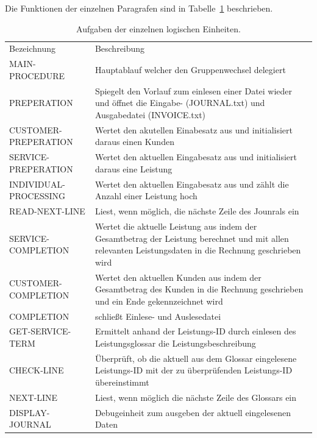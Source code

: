 Die Funktionen der einzelnen Paragrafen sind in Tabelle~\ref{tab:prog-strukt} beschrieben.


\begin{table}[!htb]
    \centering
    \begin{tabularx}{\textwidth}{X | X }
       \rowcolor{fhfarbe!25}
       Bezeichnung                             & Beschreibung             \\
       \rowcolor{fhfarbe!10}
       MAIN-PROCEDURE & Hauptablauf welcher den Gruppenwechsel delegiert \\
       PREPERATION & Spiegelt den Vorlauf zum einlesen einer Datei wieder und öffnet die Eingabe- (JOURNAL.txt) und Ausgabedatei (INVOICE.txt) \\
       CUSTOMER-PREPERATION & Wertet den akutellen Einabesatz aus und initialisiert daraus einen Kunden \\
       SERVICE-PREPERATION & Wertet den aktuellen Eingabesatz aus und initialisiert daraus eine Leistung \\
       INDIVIDUAL-PROCESSING & Wertet den aktuellen Eingabesatz aus und zählt die Anzahl einer Leistung hoch \\
       READ-NEXT-LINE & Liest, wenn möglich, die nächste Zeile des Jounrals ein \\
       SERVICE-COMPLETION & Wertet die aktuelle Leistung aus indem der Gesamtbetrag der Leistung berechnet und mit allen relevanten Leistungsdaten in die Rechnung geschrieben wird \\
       CUSTOMER-COMPLETION & Wertet den aktuellen Kunden aus indem der Gesamtbetrag des Kunden in die Rechnung geschrieben und ein Ende gekennzeichnet wird \\
       COMPLETION & schließt Einlese- und Auslesedatei \\
       
       \rowcolor{fhfarbe!10}
       GET-SERVICE-TERM & Ermittelt anhand der Leistungs-ID durch einlesen des Leistungsglossar die Leistungsbeschreibung \\
       CHECK-LINE & Überprüft, ob die aktuell aus dem Glossar eingelesene Leistungs-ID mit der zu überprüfenden Leistungs-ID übereinstimmt \\
       NEXT-LINE & Liest, wenn möglich die nächste Zeile des Glossars ein\\
       DISPLAY-JOURNAL & Debugeinheit zum ausgeben der aktuell eingelesenen Daten \\
    \end{tabularx}
    \caption{Aufgaben der einzelnen logischen Einheiten.}\label{tab:prog-strukt}
\end{table}
